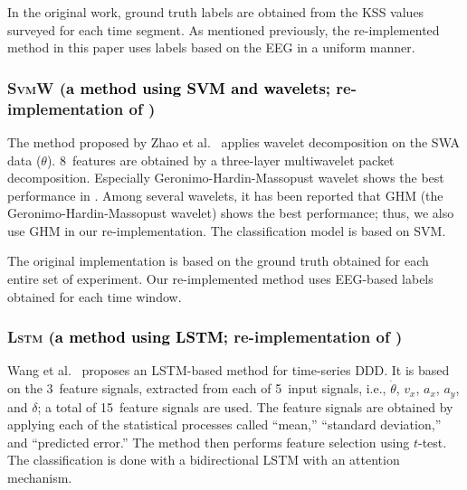 \documentclass[letterpaper, 10 pt, conference]{ieeeconf}  %
\newcommand{\Ishii}[1]{\textcolor{black}{#1}}
\newcommand{\Impl}[1]{\textsc{#1}}
\begin{document}
In the original work, ground truth labels are obtained from the KSS values surveyed for each time segment.
As mentioned previously, the re-implemented method in this paper uses labels based on the EEG in a uniform manner.

\vspace{.5em}

\subsubsection{\Impl{SvmW} (\Ishii{a method using SVM and wavelets}; re-implementation of \cite{Zhao2009})} \label{sec:ddd_svmA}

The method proposed by Zhao et al.~\cite{Zhao2009} applies wavelet decomposition on the SWA data ($\theta$).
8~features are obtained by a three-layer multiwavelet packet decomposition.
Especially Geronimo-Hardin-Massopust wavelet shows the best performance in \cite{Zhao2009}.
Among several wavelets, it has been reported that GHM (the Geronimo-Hardin-Massopust wavelet) shows the best performance;
thus, we also use GHM in our re-implementation.
The classification model is based on SVM. 

The original implementation is based on the ground truth obtained for each entire set of experiment.
Our re-implemented method uses EEG-based labels obtained for each time window.

\vspace{.5em}

\subsubsection{\Impl{Lstm} (\Ishii{a method using LSTM}; re-implementation of \cite{Wang2022})}

Wang et al.~\cite{Wang2022} proposes an LSTM-based method for time-series DDD.
It is based on the 3~feature signals, extracted from each of 5~input signals, i.e., $\dot{\theta}$, $v_x$, $a_x$, $a_y$, and $\delta$; a total of 15~feature signals are used.
The feature signals are obtained by applying each of the statistical processes called
``mean,'' ``standard deviation,'' and ``predicted error.''
%
The method then performs feature selection using $t$-test.
The classification is done with a bidirectional LSTM with an attention mechanism.
\end{document}
